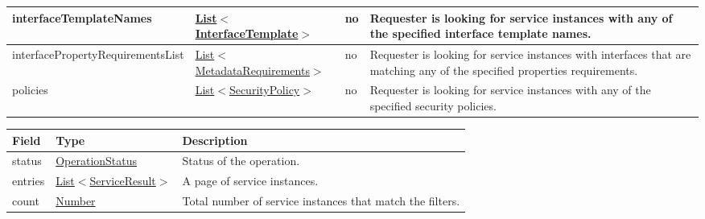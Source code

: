 \documentclass[a4paper]{arrowhead}
\newcommand{\pref}[1]{{\textcolor{ArrowheadGrey}{\hyperref[sec:model:primitives:#1]{#1}}}}
\begin{document}
\begin{table}[ht!]
\begin{tabularx}{\textwidth}{| p{5.6cm} | p{4.9cm} | p{2cm} | X |} \hline
interfaceTemplateNames &  \pref{List}$<$\pref{InterfaceTemplate}$>$ & no & Requester is looking for service ins\-tances with any of the specified interface template names. \\ \hline
interfacePropertyRequirementsList & \pref{List}$<$\hyperref[sec:model:MetadataRequirements]{MetadataRequirements}$>$ & no & Requester is looking for service ins\-tances with interfaces that are matching any of the specified pro\-perties requirements.  \\ \hline
policies &  \pref{List}$<$\pref{SecurityPolicy}$>$ & no & Requester is looking for service ins\-tances with any of the specified security policies. \\ \hline
\end{tabularx}
\end{table}


\begin{table}[ht!]
\begin{tabularx}{\textwidth}{| p{2.5cm} | p{3.5cm} | X |} \hline
\rowcolor{gray!33} Field & Type      & Description \\ \hline
status & \pref{OperationStatus} & Status of the operation. \\ \hline
entries & \pref{List}$<$\hyperref[sec:model:ServiceResult]{ServiceResult}$>$ & A page of service instances. \\ \hline
count & \pref{Number} & Total number of service instances that match the filters. \\ \hline
\end{tabularx}
\end{table}

 
\end{document}
